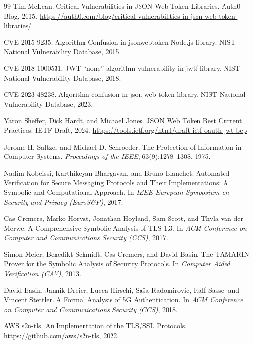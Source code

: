 \documentclass[11pt,a4paper]{article}
\theoremstyle{definition}
\begin{document}
\begin{thebibliography}{99}
Tim McLean.
\newblock Critical Vulnerabilities in JSON Web Token Libraries.
\newblock Auth0 Blog, 2015.
\newblock \url{https://auth0.com/blog/critical-vulnerabilities-in-json-web-token-libraries/}

CVE-2015-9235.
\newblock Algorithm Confusion in jsonwebtoken Node.js library.
\newblock NIST National Vulnerability Database, 2015.

CVE-2018-1000531.
\newblock JWT ``none'' algorithm vulnerability in jwtf library.
\newblock NIST National Vulnerability Database, 2018.

CVE-2023-48238.
\newblock Algorithm confusion in json-web-token library.
\newblock NIST National Vulnerability Database, 2023.

Yaron Sheffer, Dick Hardt, and Michael Jones.
\newblock JSON Web Token Best Current Practices.
\newblock IETF Draft, 2024.
\newblock \url{https://tools.ietf.org/html/draft-ietf-oauth-jwt-bcp}

Jerome H. Saltzer and Michael D. Schroeder.
\newblock The Protection of Information in Computer Systems.
\newblock \textit{Proceedings of the IEEE}, 63(9):1278--1308, 1975.

Nadim Kobeissi, Karthikeyan Bhargavan, and Bruno Blanchet.
\newblock Automated Verification for Secure Messaging Protocols and Their Implementations: A Symbolic and Computational Approach.
\newblock In \textit{IEEE European Symposium on Security and Privacy (EuroS\&P)}, 2017.

Cas Cremers, Marko Horvat, Jonathan Hoyland, Sam Scott, and Thyla van der Merwe.
\newblock A Comprehensive Symbolic Analysis of TLS 1.3.
\newblock In \textit{ACM Conference on Computer and Communications Security (CCS)}, 2017.

Simon Meier, Benedikt Schmidt, Cas Cremers, and David Basin.
\newblock The TAMARIN Prover for the Symbolic Analysis of Security Protocols.
\newblock In \textit{Computer Aided Verification (CAV)}, 2013.

David Basin, Jannik Dreier, Lucca Hirschi, Saša Radomirovic, Ralf Sasse, and Vincent Stettler.
\newblock A Formal Analysis of 5G Authentication.
\newblock In \textit{ACM Conference on Computer and Communications Security (CCS)}, 2018.

AWS s2n-tls.
\newblock An Implementation of the TLS/SSL Protocols.
\newblock \url{https://github.com/aws/s2n-tls}, 2022.


\end{thebibliography}
\end{document}
